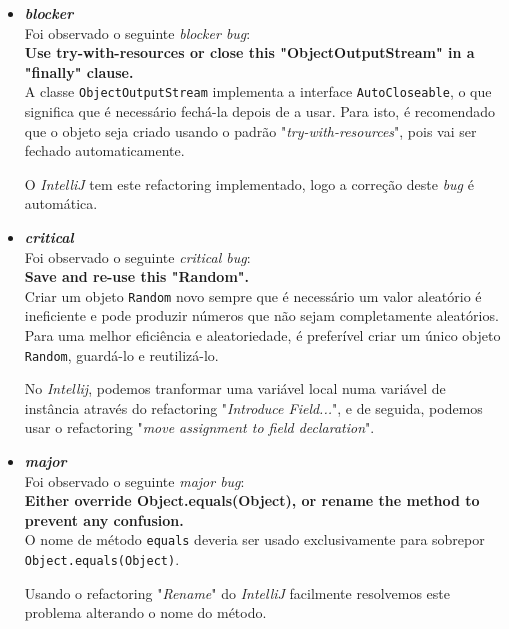 \documentclass[a4paper]{report}
\begin{document}
\begin{itemize}
    \item \textit{\textbf{blocker}}\\
        Foi observado o seguinte \textit{blocker bug}:\\
        \textbf{Use try-with-resources or close this "ObjectOutputStream" in a "finally" clause.}\\
        
        A classe \texttt{ObjectOutputStream} implementa a interface \texttt{AutoCloseable}, o que significa que é necessário fechá-la depois de a usar. Para isto, é recomendado que o objeto seja criado usando o padrão "\textit{try-with-resources}", pois vai ser fechado automaticamente.
        
        O \textit{IntelliJ} tem este refactoring implementado, logo a correção deste \textit{bug} é automática.

    
    \item \textit{\textbf{critical}}\\
        Foi observado o seguinte \textit{critical bug}:\\
        \textbf{Save and re-use this "Random".}\\
        
        Criar um objeto \texttt{Random} novo sempre que é necessário um valor aleatório é ineficiente e pode produzir números que não sejam completamente aleatórios. Para uma melhor eficiência e aleatoriedade, é preferível criar um único objeto \texttt{Random}, guardá-lo e reutilizá-lo.
        
        No \textit{Intellij}, podemos tranformar uma variável local numa variável de instância através do refactoring "\textit{Introduce Field...}", e de seguida, podemos usar o refactoring "\textit{move assignment to field declaration}".
        
        
    \item \textit{\textbf{major}}\\
        Foi observado o seguinte \textit{major bug}:\\
        \textbf{Either override Object.equals(Object), or rename the method to prevent any confusion.}\\
        
        O nome de método \texttt{equals} deveria ser usado exclusivamente para sobrepor \texttt{Object.equals(Object)}.
        
        Usando o refactoring "\textit{Rename}" do \textit{IntelliJ} facilmente resolvemos este problema alterando o nome do método.
        

\end{itemize}
\end{document}
